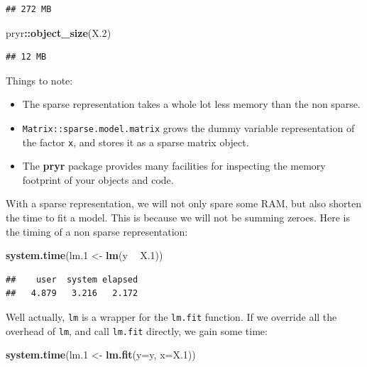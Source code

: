\documentclass[]{book}
\newenvironment{Shaded}{\begin{snugshade}}{\end{snugshade}}
\newcommand{\DataTypeTok}[1]{\textcolor[rgb]{0.13,0.29,0.53}{#1}}
\newcommand{\FloatTok}[1]{\textcolor[rgb]{0.00,0.00,0.81}{#1}}
\newcommand{\KeywordTok}[1]{\textcolor[rgb]{0.13,0.29,0.53}{\textbf{#1}}}
\newcommand{\NormalTok}[1]{#1}
\newcommand{\OperatorTok}[1]{\textcolor[rgb]{0.81,0.36,0.00}{\textbf{#1}}}
\newcommand{\StringTok}[1]{\textcolor[rgb]{0.31,0.60,0.02}{#1}}
\providecommand{\tightlist}{%
  \setlength{\itemsep}{0pt}\setlength{\parskip}{0pt}}
\theoremstyle{definition}
\theoremstyle{definition}
\theoremstyle{definition}
\theoremstyle{remark}
\begin{document}
\begin{verbatim}
## 272 MB
\end{verbatim}

\begin{Shaded}
\begin{Highlighting}[]
\NormalTok{pryr}\OperatorTok{::}\KeywordTok{object_size}\NormalTok{(X}\FloatTok{.2}\NormalTok{)}
\end{Highlighting}
\end{Shaded}

\begin{verbatim}
## 12 MB
\end{verbatim}

Things to note:

\begin{itemize}
\tightlist
\item
  The sparse representation takes a whole lot less memory than the non sparse.
\item
  \texttt{Matrix::sparse.model.matrix} grows the dummy variable representation of the factor \texttt{x}, and stores it as a sparse matrix object.
\item
  The \textbf{pryr} package provides many facilities for inspecting the memory footprint of your objects and code.
\end{itemize}

With a sparse representation, we will not only spare some RAM, but also shorten the time to fit a model. This is because we will not be summing zeroes.
Here is the timing of a non sparse representation:

\begin{Shaded}
\begin{Highlighting}[]
\KeywordTok{system.time}\NormalTok{(lm}\FloatTok{.1}\NormalTok{ <-}\StringTok{ }\KeywordTok{lm}\NormalTok{(y }\OperatorTok{~}\StringTok{ }\NormalTok{X}\FloatTok{.1}\NormalTok{)) }
\end{Highlighting}
\end{Shaded}

\begin{verbatim}
##    user  system elapsed 
##   4.879   3.216   2.172
\end{verbatim}

Well actually, \texttt{lm} is a wrapper for the \texttt{lm.fit} function.
If we override all the overhead of \texttt{lm}, and call \texttt{lm.fit} directly, we gain some time:

\begin{Shaded}
\begin{Highlighting}[]
\KeywordTok{system.time}\NormalTok{(lm}\FloatTok{.1}\NormalTok{ <-}\StringTok{ }\KeywordTok{lm.fit}\NormalTok{(}\DataTypeTok{y=}\NormalTok{y, }\DataTypeTok{x=}\NormalTok{X}\FloatTok{.1}\NormalTok{))}
\end{Highlighting}
\end{Shaded}
\end{document}
